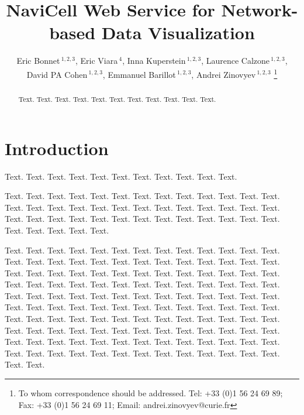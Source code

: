 \documentclass[a4,center,fleqn]{NAR}
\begin{document}
\title{NaviCell Web Service for Network-based Data Visualization}


\author{%
Eric Bonnet\,$^{1,2,3}$,
Eric Viara\,$^{4}$,
Inna Kuperstein\,$^{1,2,3}$,
Laurence Calzone\,$^{1,2,3}$,
David PA Cohen\,$^{1,2,3}$,
Emmanuel Barillot\,$^{1,2,3}$,
Andrei Zinovyev\,$^{1,2,3}$%
\footnote{To whom correspondence should be addressed.
Tel: +33 (0)1 56 24 69 89; Fax: +33 (0)1 56 24 69 11; Email: andrei.zinovyev@curie.fr}}

\address{%
$^{1}$Institut Curie, 26 rue d'Ulm, 75248 Paris, France, 
$^{2}$INSERM U900, 75248 Paris, France,
$^{3}$Mines ParisTech, 77300 Fontainebleau, France,
$^{4}$Sysra, 91330 Yerres, France.
}




\maketitle

\begin{abstract}
Text. Text. Text. Text. Text. Text. Text. Text. Text. Text. Text.
\end{abstract}


\section{Introduction}

Text. Text. Text. Text. Text. Text. Text. Text. Text. Text. Text.

Text. Text. Text. Text. Text. Text. Text. Text. Text. Text. Text.
Text. Text. Text. Text. Text. Text. Text. Text. Text. Text. Text.
Text. Text. Text. Text. Text. Text. Text. Text. Text. Text. Text.
Text. Text. Text. Text. Text. Text. Text. Text. Text. Text. Text.

Text. Text. Text. Text. Text. Text. Text. Text. Text. Text. Text.
Text. Text. Text. Text. Text. Text. Text. Text. Text. Text. Text.
Text. Text. Text. Text. Text. Text. Text. Text. Text. Text. Text.
Text. Text. Text. Text. Text. Text. Text. Text. Text. Text. Text.
Text. Text. Text. Text. Text. Text. Text. Text. Text. Text. Text.
Text. Text. Text. Text. Text. Text. Text. Text. Text. Text. Text.
Text. Text. Text. Text. Text. Text. Text. Text. Text. Text. Text.
Text. Text. Text. Text. Text. Text. Text. Text. Text. Text. Text.
Text. Text. Text. Text. Text. Text. Text. Text. Text. Text. Text.
Text. Text. Text. Text. Text. Text. Text. Text. Text. Text. Text.
Text. Text. Text. Text. Text. Text. Text. Text. Text. Text. Text.
Text. Text. Text. Text. Text. Text. Text. Text. Text. Text. Text.
\end{document}
